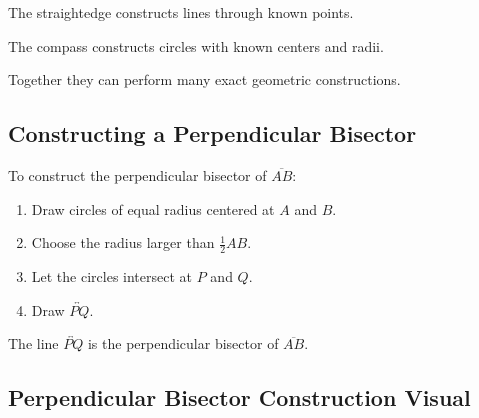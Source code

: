 The straightedge constructs lines through known points.

The compass constructs circles with known centers and radii.

Together they can perform many exact geometric constructions.

\subsection{Constructing a Perpendicular Bisector}
\label{subsec:construct-perpendicular-bisector}

To construct the perpendicular bisector of \(\overline{AB}\):

\begin{enumerate}
    \item Draw circles of equal radius centered at \(A\) and \(B\).
    \item Choose the radius larger than \(\frac12AB\).
    \item Let the circles intersect at \(P\) and \(Q\).
    \item Draw \(\overleftrightarrow{PQ}\).
\end{enumerate}

The line \(\overleftrightarrow{PQ}\) is the perpendicular bisector of
\(\overline{AB}\).

\subsection{Perpendicular Bisector Construction Visual}
\label{subsec:perpendicular-bisector-construction-visual}

\begin{centereddiagram}
\end{centereddiagram}

